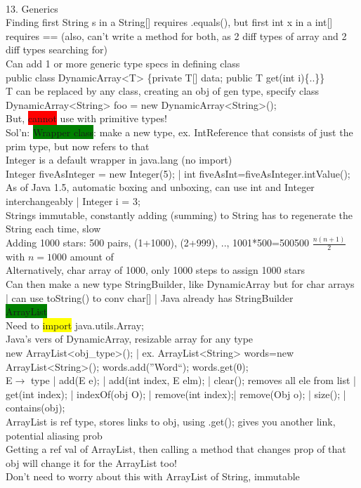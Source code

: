 ~\\ \color{BurntOrange}
13. Generics
\\ Finding first String s in a String[] requires .equals(), but first int x in a int[] requires == (also, can't write a method for both, as 2 diff types of array and 2 diff types searching for)
\\ Can add 1 or more generic type specs in defining class
\\ public class DynamicArray<T> \{private T[] data; public T get(int i)\{..\}\}
\\ T can be replaced by any class, creating an obj of gen type, specify class
\\ DynamicArray<String> foo = new DynamicArray<String>();
\\ But, \colorbox{Red}{cannot} use with primitive types!
\\ Sol'n: \colorbox{Green}{Wrapper class}: make a new type, ex. IntReference that consists of just the prim type, but now refers to that
\\ Integer is a default wrapper in java.lang (no import)
\\ Integer fiveAsInteger = new Integer(5); | int fiveAsInt=fiveAsInteger.intValue();
\\ As of Java 1.5, automatic boxing and unboxing, can use int and Integer interchangeably | Integer i = 3;
\\ Strings immutable, constantly adding (summing) to String has to regenerate the String each time, slow
\\ Adding 1000 stars: 500 pairs, (1+1000), (2+999), .., 1001*500=500500 $\frac{n(n+1)}{2}$ with $n=1000$ amount of 
\\ Alternatively, char array of 1000, only 1000 steps to assign 1000 stars
\\ Can then make a new type StringBuilder, like DynamicArray but for char arrays | can use toString() to conv char[] | Java already has StringBuilder
\\ \colorbox{Green}{ArrayList}
\\ Need to \colorbox{Yellow}{import} java.utils.Array;
\\ Java's vers of DynamicArray, resizable array for any type
\\ new ArrayList<obj\_type>(); | ex. ArrayList<String> words=new ArrayList<String>(); words.add(''Word``); words.get(0);
\\ E$\rightarrow$ type | add(E e); | add(int index, E elm); | clear(); removes all ele from list | get(int index); | indexOf(obj O); | remove(int index);| remove(Obj o); | size(); | contains(obj);
\\ ArrayList is ref type, stores links to obj, using .get(); gives you another link, potential aliasing prob
\\ Getting a ref val of ArrayList, then calling a method that changes prop of that obj will change it for the ArrayList too!
\\ Don't need to worry about this with ArrayList of String, immutable

